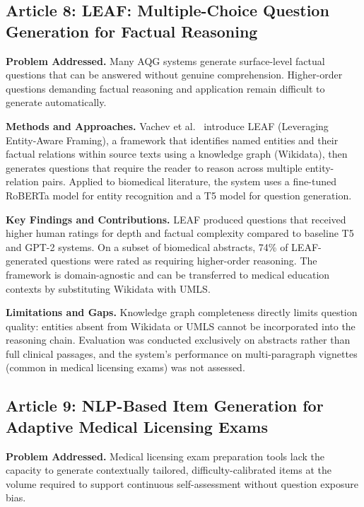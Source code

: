 \documentclass[conference]{IEEEtran}
\begin{document}
\subsection{Article 8: LEAF: Multiple-Choice Question Generation for Factual Reasoning~\cite{vachev2022leaf}}

\textbf{Problem Addressed.} Many AQG systems generate surface-level factual questions that can be answered without genuine comprehension. Higher-order questions demanding factual reasoning and application remain difficult to generate automatically.

\textbf{Methods and Approaches.} Vachev et al.~\cite{vachev2022leaf} introduce LEAF (Leveraging Entity-Aware Framing), a framework that identifies named entities and their factual relations within source texts using a knowledge graph (Wikidata), then generates questions that require the reader to reason across multiple entity-relation pairs. Applied to biomedical literature, the system uses a fine-tuned RoBERTa model for entity recognition and a T5 model for question generation.

\textbf{Key Findings and Contributions.} LEAF produced questions that received higher human ratings for depth and factual complexity compared to baseline T5 and GPT-2 systems. On a subset of biomedical abstracts, 74\% of LEAF-generated questions were rated as requiring higher-order reasoning. The framework is domain-agnostic and can be transferred to medical education contexts by substituting Wikidata with UMLS.

\textbf{Limitations and Gaps.} Knowledge graph completeness directly limits question quality: entities absent from Wikidata or UMLS cannot be incorporated into the reasoning chain. Evaluation was conducted exclusively on abstracts rather than full clinical passages, and the system's performance on multi-paragraph vignettes (common in medical licensing exams) was not assessed.

\subsection{Article 9: NLP-Based Item Generation for Adaptive Medical Licensing Exams~\cite{raamadhurai2019nlp}}

\textbf{Problem Addressed.} Medical licensing exam preparation tools lack the capacity to generate contextually tailored, difficulty-calibrated items at the volume required to support continuous self-assessment without question exposure bias.
\end{document}
